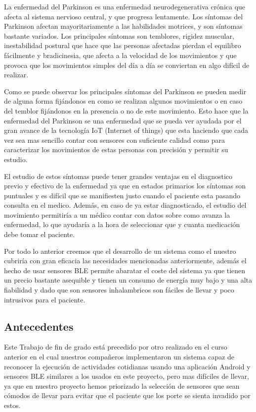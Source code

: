 \documentclass[11pt,spanish]{article}
\begin{document}
La enfermedad del Parkinson es una enfermedad neurodegenerativa crónica que afecta al sistema nervioso central, y que progresa lentamente. Los síntomas del Parkinson afectan mayoritariamente a las habilidades motrices, y son síntomas bastante variados. Los principales síntomas son temblores, rigidez muscular, inestabilidad postural que hace que las personas afectadas pierdan el equilibro fácilmente y bradicinesia, que afecta a la velocidad de los movimientos y que provoca que los movimientos simples del día a día se conviertan en algo difícil de realizar.
\newline

Como se puede observar los principales síntomas del Parkinson se pueden medir de alguna forma fijándonos en como se realizan algunos movimientos o en caso del temblor fijándonos en la presencia o no de este movimiento. Esto hace que la enfermedad del Parkinson se una enfermedad que se pueda ver ayudada por el gran avance de la tecnología IoT (Internet of things) que esta haciendo que cada vez sea mas sencillo contar con sensores con suficiente calidad como para caracterizar los movimientos de estas personas con precisión y permitir su estudio.
\newline

El estudio de estos síntomas puede tener grandes ventajas en el diagnostico previo y efectivo de la enfermedad ya que en estados primarios los síntomas son puntuales y es difícil que se manifiesten justo cuando el paciente esta pasando consulta en el medico. Además, en caso de ya estar diagnosticado, el estudio del movimiento permitiría a un médico contar con datos sobre como avanza la enfermedad, lo que ayudaría a la hora de seleccionar que y cuanta medicación debe tomar el paciente.
\newline

Por todo lo anterior creemos que el desarrollo de un sistema como el nuestro cubriría con gran eficacia las necesidades mencionadas anteriormente, además el hecho de usar sensores BLE permite abaratar el coste del sistema ya que tienen un precio bastante asequible y tienen un consumo de energía muy bajo y una alta fiabilidad y dado que son sensores inhalambricos son fáciles de llevar y poco intrusivos para el paciente.

\subsection{Antecedentes}

Este Trabajo de fin de grado está precedido por otro realizado en el curso anterior \cite{TFG_Anterior}  en el cual nuestros compañeros implementaron un sistema capaz de reconocer la ejecución de actividades cotidianas usando una aplicación Android y sensores BLE similares a los usados en este proyecto, pero mas difíciles de llevar, ya que en nuestro proyecto hemos priorizado la selección de sensores que sean cómodos de llevar para evitar que el paciente que los porte se sienta invadido por estos. 
\newline
\end{document}
